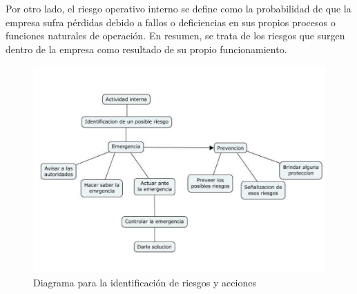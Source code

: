     Por otro lado, el riesgo operativo interno se define como la probabilidad de que la empresa sufra pérdidas debido a fallos o deficiencias en sus propios procesos o funciones naturales de operación. En resumen, se trata de los riesgos que surgen dentro de la empresa como resultado de su propio funcionamiento.
    \begin{figure}[H]
        \centering
        \includegraphics[scale=0.185]{30/img/Riesgos internos.pdf}
        \caption{Diagrama para la identificación de riesgos y acciones}
    \end{figure}
